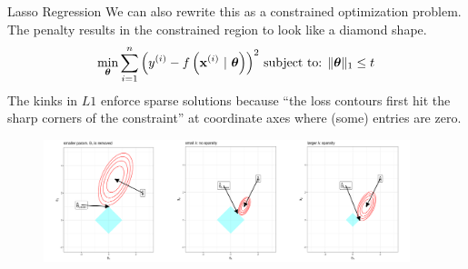\documentclass[11pt,compress,t,notes=noshow, xcolor=table]{beamer}
\begin{document}
\begin{vbframe}{Lasso Regression}
We can also rewrite this as a constrained optimization problem. The penalty results in the constrained region to look like a diamond shape.
\vspace{-0.2cm}
\begin{eqnarray*}
\min_{\bm{\theta}} \sum\limits_{i=1}^n \left(y^{(i)} - f\left(\mathbf{x}^{(i)} ~|~ \bm{\theta}\right)\right)^2\,
\text{subject to: } \|\bm{\theta}\|_1 \leq t
\end{eqnarray*}
The kinks in $L1$ enforce sparse solutions because ``the loss contours first hit the sharp corners of the constraint'' at coordinate axes where (some) entries are zero. 
\vspace{-0.1cm}
\begin{figure}%
\includegraphics[width=0.95\textwidth]
{figure/lasso_contour_cases.png}\\
\end{figure}

\end{vbframe}
\end{document}

